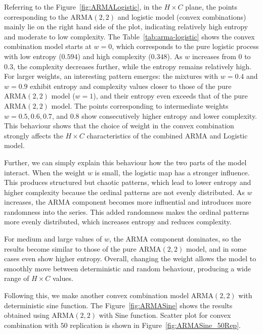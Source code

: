 \documentclass[12pt,a4paper]{article}
\begin{document}
Referring to the Figure~\ref{fig:ARMALogistic}, in the $H \times C$ plane, the points corresponding to the $\mathrm{ARMA}(2,2)$  and logistic model (convex combinations) mainly lie on the right hand side of the plot, indicating relatively high entropy and moderate to low complexity. 
The Table~\ref{tab:arma-logistic} shows the convex combination model starts at $w = 0$, which corresponds to the pure logistic process with low entropy ($0.594$) and high complexity ($0.348$). 
As $w$ increases from $0$ to $0.3$, the complexity decreases further, while the entropy remains relatively high. 
For larger weights, an interesting pattern emerges: the mixtures with $w = 0.4$ and $w = 0.9$ exhibit entropy and complexity values closer to those of the pure $\mathrm{ARMA}(2,2)$ model ($w=1$), and their entropy even exceeds that of the pure $\mathrm{ARMA}(2,2)$ model. 
The points corresponding to intermediate weights $w = 0.5, 0.6, 0.7$, and $0.8$ show consecutively higher entropy and lower complexity. 
This behaviour shows that the choice of weight in the convex combination strongly affects the $H \times C$ characteristics of the combined $\mathrm{ARMA}$ and Logistic model.

Further, we can simply explain this behaviour how the two parts of the model interact. When the weight $w$ is small, the logistic map has a stronger influence. This produces structured but chaotic patterns, which lead to lower entropy and higher complexity because the ordinal patterns are not evenly distributed. As $w$ increases, the $\mathrm{ARMA}$ component becomes more influential and introduces more randomness into the series. This added randomness makes the ordinal patterns more evenly distributed, which increases entropy and reduces complexity. 

For medium and large values of $w$, the $\mathrm{ARMA}$ component dominates, so the results become similar to those of the pure $\mathrm{ARMA}(2,2)$ model, and in some cases even show higher entropy. Overall, changing the weight allows the model to smoothly move between deterministic and random behaviour, producing a wide range of $H \times C$ values.


Following this, we make another convex combination model $\mathrm{ARMA}(2,2)$ with deterministic sine function. 
The Figure~\ref{fig:ARMASine} shows the results obtained using $\mathrm{ARMA}(2,2)$ with Sine function. 
Scatter plot for convex combination  with $50$ replication is shown in Figure~\ref{fig:ARMASine_50Rep}.
\end{document}
